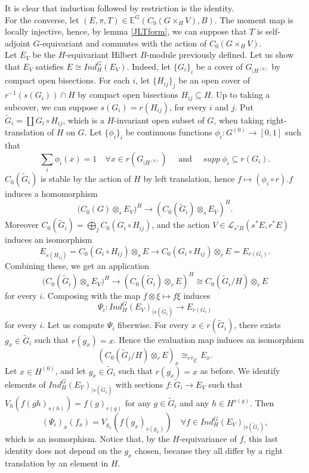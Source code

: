 \begin{dem} It is clear that induction followed by restriction is the identity.\\ 

For the converse, let $(E,\pi,T)\in \mathbb E^G(C_0(G\times_H V),B)$. The moment map is locally injective, hence, by lemma \ref{JLTform}, we can suppose that $T$ is self-adjoint $G$-equivariant and commutes with the action of $C_0(G\times_H V)$.\\

Let $E_V$ be the $H$-equivariant Hilbert $B$-module previously defined. Let us show that $E_{V}$ satisfies $E\cong Ind_H^G (E_V)$. Indeed, let $\{G_i\}_i$ be a cover of $G_{|H^{(0)}}$ by compact open bisections. For each $i$, let $\{H_{ij}\}_j$ be an open cover of $r^{-1}( s(G_i))\cap H$ by compact open bisections $H_{ij} \subseteq H$. Up to taking a subcover, we can suppose $s(G_i) = r(H_{ij})$, for every $i$ and $j$. Put $\tilde G_i = \coprod G_i \circ H_{ij}$, which is a $H$-invariant open subset of $G$, when taking right-translation of $H$ on $G$. Let $\{\phi_i\}_i$ be continuous functions $\phi_i : G^{(0)}\rightarrow [0,1]$ such that 
\[\sum_{i} \phi_i(x) = 1\quad \forall x\in r(G_{|H^{(0)}}) \quad \text{ and } \quad supp \ \phi_i\subseteq r(G_i) .\]
$C_0(\tilde G_i)$ is stable by the action of $H$ by left translation, hence $f\mapsto (\phi_i\circ r) . f$ induces a homomorphism 
\[\Big(C_0(G)\otimes_s E_V\Big)^H \rightarrow \left( C_0(\tilde G_i)\otimes_s E_V\right)^H .\]  
Moreover $C_0(\tilde G_i) = \bigoplus_j C_0(G_i\circ H_{ij})$, and the action $V\in \mathcal L_{s^*B}(s^* E, r^* E)$ induces an isomorphism
\[ E_{s(H_{ij})}=C_0(G_i\circ H_{ij})\otimes_s E \rightarrow C_0(G_i\circ H_{ij})\otimes_r E = E_{r(G_{i})}. \]
Combining these, we get an application 
\[ \Big(C_0(\tilde G_i)\otimes_s E_V\Big)^H \rightarrow (C_0(\tilde G_i)\otimes_r E)^H \cong C_0(\tilde G_i/H)\otimes_r E \]
for every $i$. Composing with the map $f\otimes \xi \mapsto f\xi$ induces
\[\Psi_i : Ind_H^G(E_V)_{|s(\tilde G_i)} \rightarrow E_{r(G_i)}\]
for every $i$. 
Let us compute $\Psi_i$ fiberwise. For every $x\in r(\tilde G_i)$, there exists $g_x\in \tilde G_i$ such that $r(g_x)=x$. Hence the evaluation map induces an isomorphism 
\[\left( C_0(\tilde G_j / H) \otimes_r E \right)_x \cong_{ev_{g_i^x}} E_x.\] 
Let $x\in H^{(0)}$, and let $g_x \in \tilde G_i$ such that $r(g_x) = x$ as before. We identify elements of $Ind_H^G(E_V)_{|s(\tilde G_i)}$ with sections $f : \tilde G_i \rightarrow E_V$ such that $V_h(f(gh)_{s(h)})= f(g)_{r(g)}$ for any $g\in \tilde G_i$ and any $h\in H^{s(g)}$. Then 
\[ (\Psi_i)_x(f_x) = V_{g_x}\left( f(g_{x})_{s(g_x)} \right)\quad \forall f\in Ind_H^G(E_V)_{|s(\tilde G_i)}, \]
which is an isomorphism. Notice that, by the $H$-equivariance of $f$, this last identity does not depend on the $g_x$ chosen, because they all differ by a right translation by an element in $H$. \\


\end{dem}
